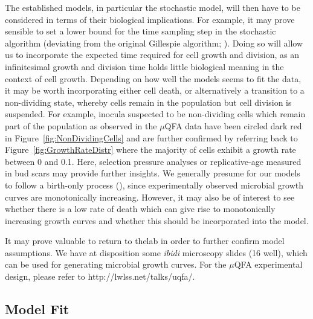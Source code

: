 \documentclass{bioinfo}
\begin{document}
The established models, in particular the stochastic model, will then have to be considered in terms of their biological implications. For example, it may prove sensible to set a lower bound for the time sampling step in the stochastic algorithm (deviating from the original Gillespie algorithm; \citealp{Gillespie77}). Doing so will allow us to incorporate the expected time required for cell growth and division, as an infinitesimal  growth and division time holds little biological meaning in the context of cell growth. %
Depending on how well the models seems to fit the data, it may be worth incorporating either cell death, or alternatively a transition to a non-dividing state, whereby cells remain in the population but cell division is suspended. For example, inocula suspected to be non-dividing cells which remain part of the population as observed in the $\mu$QFA data have been circled dark red in Figure~\ref{fig:NonDividingCells} and are further confirmed by referring back to Figure~\ref{fig:GrowthRateDistr} where the majority of cells exhibit a growth rate between 0 and 0.1. Here, selection pressure analyses or replicative-age measured in bud scars may provide further insights. %
We generally presume for our models to follow a birth-only process (\citealp{Bailey64}), since experimentally  observed microbial growth curves are monotonically increasing. However, it may also be of interest to see whether there is a low rate of death which can give rise to monotonically increasing growth curves and whether this should be incorporated into the model. %

It may prove valuable to return to thelab in order to further confirm model assumptions. We have at disposition some \textit{ibidi} microscopy slides (16 well), which can be used for generating microbial growth curves. For the $\mu$QFA experimental design, please refer to http://lwlss.net/talks/uqfa/. 

\subsection{Model Fit}
\end{document}
